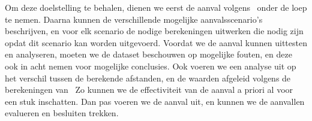 Om deze doelstelling te behalen, dienen we eerst de aanval
volgens~\citeauthor{Dhondt} onder de loep te nemen. Daarna kunnen de
verschillende mogelijke aanvalsscenario's beschrijven, en voor elk scenario de
nodige berekeningen uitwerken die nodig zijn opdat dit scenario kan worden
uitgevoerd. Voordat we de aanval kunnen uittesten en analyseren, moeten we de
dataset beschouwen op mogelijke fouten, en deze ook in acht nemen voor
mogelijke conclusies. Ook voeren we een analyse uit op het verschil tussen de
berekende afstanden, en de waarden afgeleid volgens de berekeningen
van~\citeauthor{Dhondt} Zo kunnen we de effectiviteit van de aanval a priori al
voor een stuk inschatten. Dan pas voeren we de aanval uit, en kunnen we de
aanvallen evalueren en besluiten trekken.